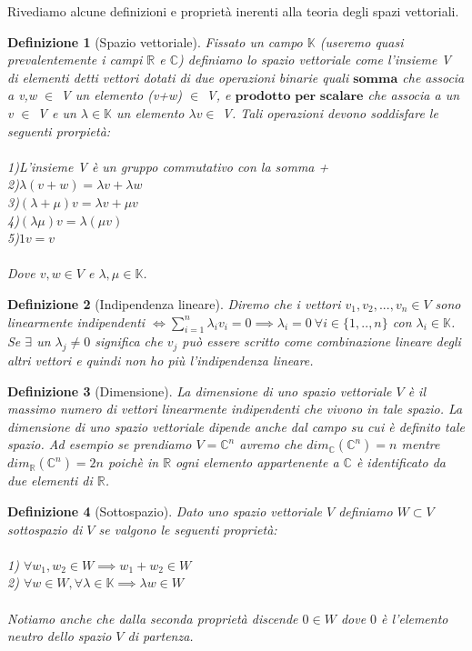 \documentclass[a4paper,12pt]{report}
\newtheorem{definizione}{Definizione}[chapter]
\begin{document}
Rivediamo alcune definizioni e proprietà inerenti alla teoria degli spazi vettoriali.
\begin{definizione}[Spazio vettoriale]
    Fissato un campo $\mathbb{K}$ (useremo quasi prevalentemente i campi $\mathbb{R}$ e $\mathbb{C}$) definiamo lo spazio vettoriale come l'insieme V di elementi detti vettori dotati di due operazioni binarie quali $\textbf{somma}$ che associa a v,w $\in$ V un elemento (v+w) $\in$ V, e $\textbf{prodotto per scalare}$ che associa a un v $\in$ V e un $\lambda \in \mathbb{K}$ un elemento $\lambda v \in$ V.
    Tali operazioni devono soddisfare le seguenti prorpietà:
    \\
    \\ 1)L'insieme V è un gruppo commutativo con la somma + 
    \\ 2)$\lambda(v+w)= \lambda v+ \lambda w$ 
    \\ 3)$( \lambda+ \mu)v= \lambda v + \mu v$
    \\ 4)$(\lambda \mu)v=\lambda (\mu v)$
    \\ 5)$1v=v$
    \\
    \\Dove $v,w \in V$ e $\lambda, \mu \in \mathbb{K}$.
\end{definizione}
\begin{definizione}[Indipendenza lineare]
    Diremo che i vettori $v_1,v_2,...,v_n\in V$ sono linearmente indipendenti $\iff \displaystyle \sum_{i=1}^{n}\lambda_i v_i =0 \implies \lambda_i=0 \ \forall i \in \{1,..,n\}$ con $\lambda_i \in \mathbb{K}$. 
    \\Se $\exists$ un $\lambda_j \neq 0$ significa che $v_j$ può essere scritto come combinazione lineare degli altri vettori e quindi non ho più l'indipendenza lineare.
\end{definizione}
\begin{definizione}[Dimensione]
    La dimensione di uno spazio vettoriale $V$ è il massimo numero di vettori linearmente indipendenti che vivono in tale spazio. La dimensione di uno spazio vettoriale dipende anche dal campo su cui è definito tale spazio. Ad esempio se prendiamo $V=\mathbb{C}^n$ avremo che $dim_{\mathbb{C}}(\mathbb{C}^n)=n$ mentre $dim_{\mathbb{R}}(\mathbb{C}^n)=2n$ poichè in $\mathbb{R}$ ogni elemento appartenente a $\mathbb{C}$ è identificato da due elementi di $\mathbb{R}$.
\end{definizione}

\newpage

\begin{definizione}[Sottospazio]
    Dato uno spazio vettoriale $V$ definiamo $W \subset V$ sottospazio di $V$ se valgono le seguenti proprietà:
    \\
    \\1) $\forall w_1,w_2 \in W \implies w_1+w_2 \in W$
    \\2) $\forall w\in W,\forall\lambda\in \mathbb{K} \implies \lambda w \in W$
    \\
    \\Notiamo anche che dalla seconda proprietà discende $0 \in W$ dove $0$ è l'elemento neutro dello spazio $V$ di partenza.
\end{definizione}
\end{document}
